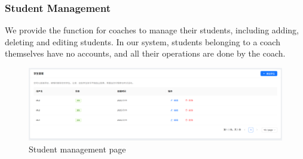 \documentclass[12pt]{article}
\begin{document}
\subsubsection{Student Management}
We provide the function for coaches to manage their students, including adding, deleting and editing students.
In our system, students belonging to a coach themselves have no accounts, and all their operations are done by the coach.
\begin{figure}[H]
    \centering
    \includegraphics[width=\textwidth]{coach/stu-manage.png}
    \caption{Student management page}
    \label{fig:StudentManagement page}
\end{figure}
\end{document}
